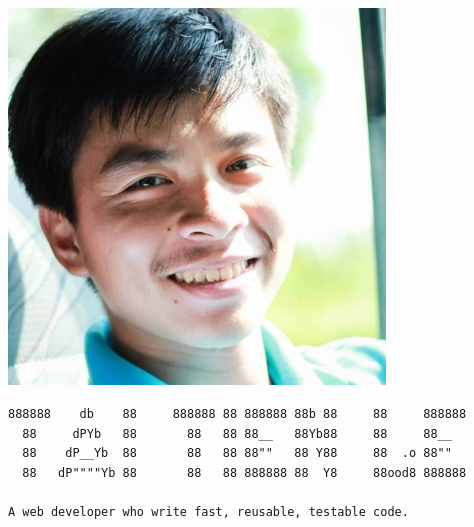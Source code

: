 \documentclass[a4paper]{article}
\begin{document}
  \noindent
  \begin{minipage}[t]{0.2\textwidth}
    \vspace{0pt}
    \begin{flushleft}
    \includegraphics[width=0.75\textwidth]{avatar}
    \end{flushleft}
  \end{minipage}
  \hspace{10pt}
  \begin{minipage}[t]{0.5\textwidth}
    \vspace{3pt}
    \begin{verbatim}
888888    db    88     888888 88 888888 88b 88     88     888888
  88     dPYb   88       88   88 88__   88Yb88     88     88__
  88    dP__Yb  88       88   88 88""   88 Y88     88  .o 88""
  88   dP""""Yb 88       88   88 888888 88  Y8     88ood8 888888

A web developer who write fast, reusable, testable code.
    \end{verbatim}
  \end{minipage}
\end{document}
